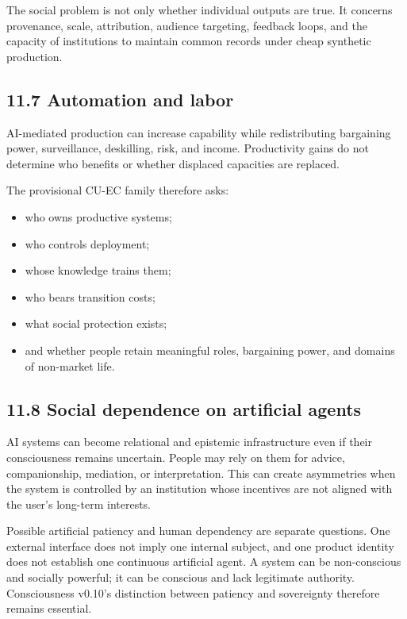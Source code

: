 \documentclass[
  11pt,
]{article}
\providecommand{\tightlist}{%
  \setlength{\itemsep}{0pt}\setlength{\parskip}{0pt}}
\begin{document}
The social problem is not only whether individual outputs are true. It
concerns provenance, scale, attribution, audience targeting, feedback
loops, and the capacity of institutions to maintain common records under
cheap synthetic production.

\subsection{11.7 Automation and labor}\label{automation-and-labor}

AI-mediated production can increase capability while redistributing
bargaining power, surveillance, deskilling, risk, and income.
Productivity gains do not determine who benefits or whether displaced
capacities are replaced.

The provisional CU-EC family therefore asks:

\begin{itemize}
\tightlist
\item
  who owns productive systems;
\item
  who controls deployment;
\item
  whose knowledge trains them;
\item
  who bears transition costs;
\item
  what social protection exists;
\item
  and whether people retain meaningful roles, bargaining power, and
  domains of non-market life.
\end{itemize}

\subsection{11.8 Social dependence on artificial
agents}\label{social-dependence-on-artificial-agents}

AI systems can become relational and epistemic infrastructure even if
their consciousness remains uncertain. People may rely on them for
advice, companionship, mediation, or interpretation. This can create
asymmetries when the system is controlled by an institution whose
incentives are not aligned with the user's long-term interests.

Possible artificial patiency and human dependency are separate
questions. One external interface does not imply one internal subject,
and one product identity does not establish one continuous artificial
agent. A system can be non-conscious and socially powerful; it can be
conscious and lack legitimate authority. Consciousness v0.10's
distinction between patiency and sovereignty therefore remains
essential.
\end{document}
